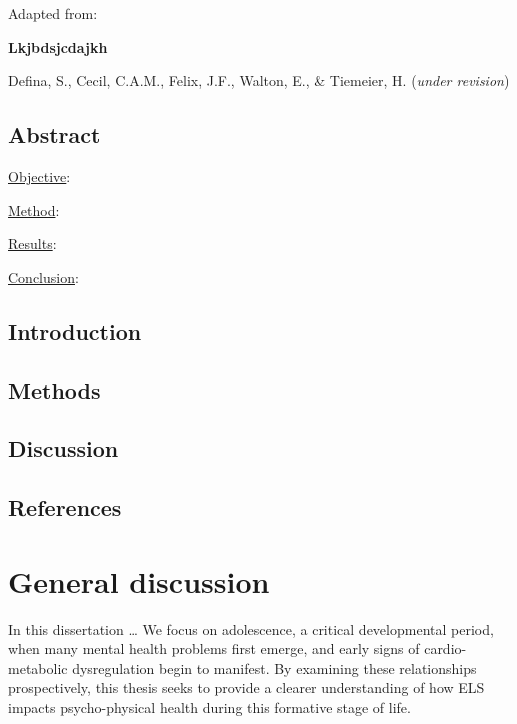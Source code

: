 \documentclass[
  letterpaper,
  DIV=11,
  numbers=noendperiod]{scrreport}
\begin{document}
Adapted from:

\textbf{Lkjbdsjcdajkh}

Defina, S., Cecil, C.A.M., Felix, J.F., Walton, E., \& Tiemeier, H.
(\emph{under revision})

\section*{Abstract}\label{abstract-5}


\ul{Objective}:

\ul{Method}:

\ul{Results}:

\ul{Conclusion}:

\newpage

\section{Introduction}\label{introduction-5}

\section{Methods}\label{methods-5}

\section{Discussion}\label{discussion-5}

\section*{References}\label{references-6}



\chapter{General discussion}\label{general-discussion}

In this dissertation \ldots{} We focus on adolescence, a critical
developmental period, when many mental health problems first emerge, and
early signs of cardio-metabolic dysregulation begin to manifest. By
examining these relationships prospectively, this thesis seeks to
provide a clearer understanding of how ELS impacts psycho-physical
health during this formative stage of life.
\end{document}
